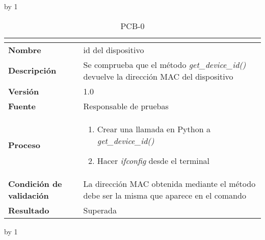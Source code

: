 \advance\pcb by 1
\begin{table}[H]
	\caption{PCB-0\number\pcb}
	\begin{tabular}{|l|p{}|}
		\hline
		\multicolumn{2}{|c|}{\cellcolor[HTML]{BFBFBF}{\color[HTML]{000000} \textbf{PCB-0\number\pcb}}} \\ \hline
		\textbf{Nombre}                  & id del dispositivo                                                                              \\ \hline
		\textbf{Descripción}             & Se comprueba que el método \textit{get\_device\_id()} devuelve la dirección MAC del dispositivo \\ \hline
		\textbf{Versión}                 & 1.0                                                                                             \\ \hline
		\textbf{Fuente}                  & Responsable de pruebas                                                                          \\ \hline
		\textbf{Proceso}                 & \begin{enumerate}
			\item Crear una llamada en Python a \textit{get\_device\_id()}
			\item Hacer \textit{ifconfig} desde el terminal
		\end{enumerate}                                                                       \\ \hline
		\textbf{Condición de validación} & La dirección MAC obtenida mediante el método debe ser la misma que aparece en el comando        \\ \hline
		\textbf{Resultado}               & Superada                                                                                        \\ \hline
	\end{tabular}
\end{table}
\advance\pcb by 1
